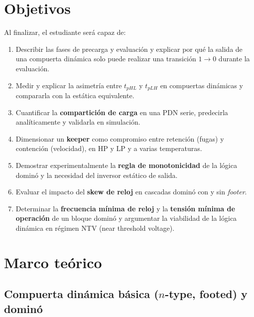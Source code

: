 \documentclass[11pt,a4paper]{article}
\begin{document}
\section{Objetivos}
Al finalizar, el estudiante será capaz de:
\begin{enumerate}[nosep]
  \item Describir las fases de precarga y evaluación y explicar por qué la salida de una compuerta dinámica solo puede realizar una transición $1\to0$ durante la evaluación.
  \item Medir y explicar la asimetría entre $t_{pHL}$ y $t_{pLH}$ en compuertas dinámicas y compararla con la estática equivalente.
  \item Cuantificar la \textbf{compartición de carga} en una PDN serie, predecirla analíticamente y validarla en simulación.
  \item Dimensionar un \textbf{keeper} como compromiso entre retención (fugas) y contención (velocidad), en HP y LP y a varias temperaturas.
  \item Demostrar experimentalmente la \textbf{regla de monotonicidad} de la lógica dominó y la necesidad del inversor estático de salida.
  \item Evaluar el impacto del \textbf{skew de reloj} en cascadas dominó con y sin \emph{footer}.
  \item Determinar la \textbf{frecuencia mínima de reloj} y la \textbf{tensión mínima de operación} de un bloque dominó y argumentar la viabilidad de la lógica dinámica en régimen NTV (near threshold voltage).
\end{enumerate}


\section{Marco teórico}

\subsection{Compuerta dinámica básica ($n$-type, footed) y dominó}
\end{document}
